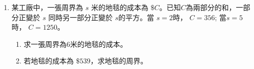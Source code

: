 \documentclass[11pt]{article}
\begin{document}
\begin{enumerate}
            \hrulefill
            
            \hrulefill
            
            \hrulefill
            
            \hrulefill
            
            \hrulefill
            
            \hrulefill
            
            \hrulefill
            
            \hrulefill
            
            \hrulefill
            
            \hrulefill

        \pagebreak
        \item 某工廠中，一張周界為 $s$ 米的地毯的成本為 $\$C$。已知$C$為兩部分的和，一部分正變於 $s$ 同時另一部分正變於 $s$的平方。當 $s=2$時， $C=356$; 當$s=5$時， $C=1250$。\begin{enumerate}
            \item 求一張周界為6米的地毯的成本。
            \item 若地毯的成本為 $\$539$，求地毯的周界。
        \end{enumerate}

        \hrulefill

            \hrulefill
            
            \hrulefill
            
            \hrulefill
            
            \hrulefill
            
            \hrulefill
            
            \hrulefill
            
            \hrulefill
            
            \hrulefill
            
            \hrulefill
            
            \hrulefill
            
            \hrulefill

            \hrulefill

            \hrulefill
            
            \hrulefill
            
            \hrulefill
            
            \hrulefill
            
            \hrulefill
            

\end{enumerate}
\end{document}
